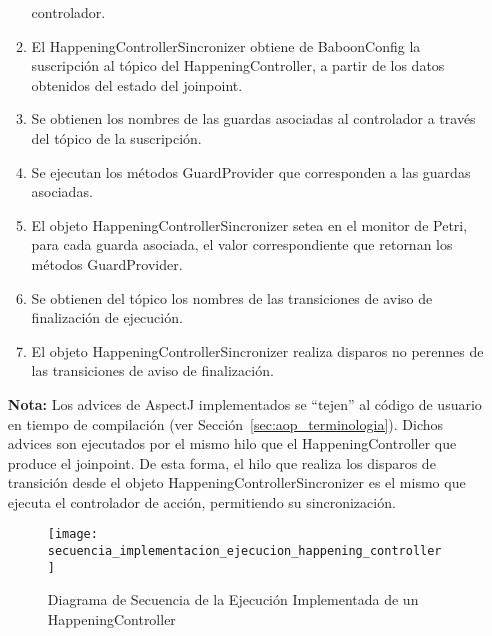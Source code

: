 \begin{itemize}
\begin{enumerate}
  	  controlador.
  	  \item El HappeningControllerSincronizer obtiene de BaboonConfig la
  	  suscripción al tópico del HappeningController, a partir de los datos
  	  obtenidos del estado del joinpoint.
  	  \item Se obtienen los nombres de las guardas asociadas al controlador a
  	  través del tópico de la suscripción.
  	  \item Se ejecutan los métodos GuardProvider que corresponden a las guardas
  	  asociadas.
  	  \item El objeto HappeningControllerSincronizer setea en el monitor de
  	  Petri, para cada guarda asociada, el valor correspondiente que retornan los métodos GuardProvider.
  	  \item Se obtienen del tópico los nombres de las transiciones de aviso de
  	  finalización de ejecución.
  	  \item El objeto HappeningControllerSincronizer realiza disparos no perennes
  	  de las transiciones de aviso de finalización.
  	\end{enumerate}
  	
  	\begin{framed}
	\textbf{Nota:} Los advices de AspectJ implementados se ``tejen'' al código de
	usuario en tiempo de compilación (ver Sección~\ref{sec:aop_terminologia}).
	Dichos advices son ejecutados por el mismo hilo que el HappeningController que
	produce el joinpoint. De esta forma, el hilo que realiza los disparos de
	transición desde el objeto HappeningControllerSincronizer es el mismo que
	ejecuta el controlador de acción, permitiendo su sincronización.
	\end{framed}



\begin{figure}[H]
	\hspace{-2,90cm}
	\texttt{[image: secuencia\_implementacion\_ejecucion\_happening\_controller]}
	\caption{Diagrama de Secuencia de la Ejecución Implementada de un
	HappeningController}
	\label{fig:diagrama_secuencia_implementacion_ejecucion_happening_controller}
\end{figure}

\end{itemize}

